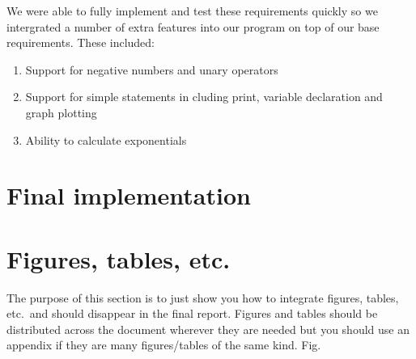 \documentclass[a4paper, oneside, 11pt]{report}
\begin{document}
We were able to fully implement and test these requirements quickly so we intergrated
a number of extra features into our program on top of our base requirements. These
included:
\begin{enumerate}
\item Support for negative numbers and unary operators
\item Support for simple statements in cluding print, variable declaration and graph plotting
\item  Ability to calculate exponentials
\end{enumerate}

\section{Final implementation}

\section{Figures, tables, etc.}

The purpose of this section is to just show you how to integrate figures, tables, etc.\ and should disappear in the final report. Figures and tables should be distributed across the document wherever they are needed but you should use an appendix if they are many figures/tables of the same kind. Fig.\ %

\begin{figure}[htb]
\end{figure}


\begin{figure}[htb]
\end{figure}

\end{document}
